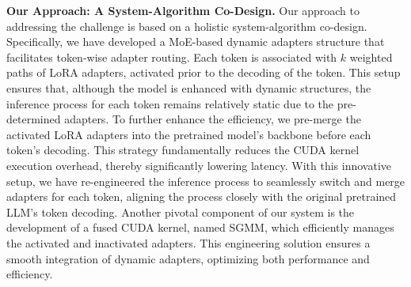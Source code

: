 \noindent\textbf{Our Approach: A System-Algorithm Co-Design.} Our approach to addressing the challenge is based on a holistic system-algorithm co-design. Specifically, we have developed a MoE-based dynamic adapters structure that facilitates token-wise adapter routing. Each token is associated with $k$ weighted paths of LoRA adapters, activated prior to the decoding of the token. 
This setup ensures that, although the model is enhanced with dynamic structures, the inference process for each token remains relatively static due to the pre-determined adapters.
To further enhance the efficiency, we pre-merge the activated LoRA adapters into the pretrained model's backbone before each token's decoding. 
This strategy fundamentally reduces the CUDA kernel execution overhead, thereby significantly lowering latency. 
With this innovative setup, we have re-engineered the inference process to seamlessly switch and merge adapters for each token, aligning the process closely with the original pretrained LLM's token decoding. 
Another pivotal component of our system is the development of a fused CUDA kernel, named SGMM, which efficiently manages the activated and inactivated adapters. 
This engineering solution ensures a smooth integration of dynamic adapters, optimizing both performance and efficiency.
% 
